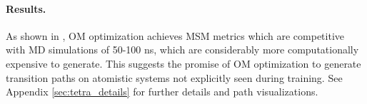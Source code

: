 \paragraph{Results.} As shown in , OM optimization achieves MSM metrics which are competitive with MD simulations of 50-100 ns, which are considerably more computationally expensive to generate. This suggests the promise of OM optimization to generate transition paths on atomistic systems not explicitly seen during training. See Appendix \ref{sec:tetra_details} for further details and path visualizations.
\vspace{-7pt}

